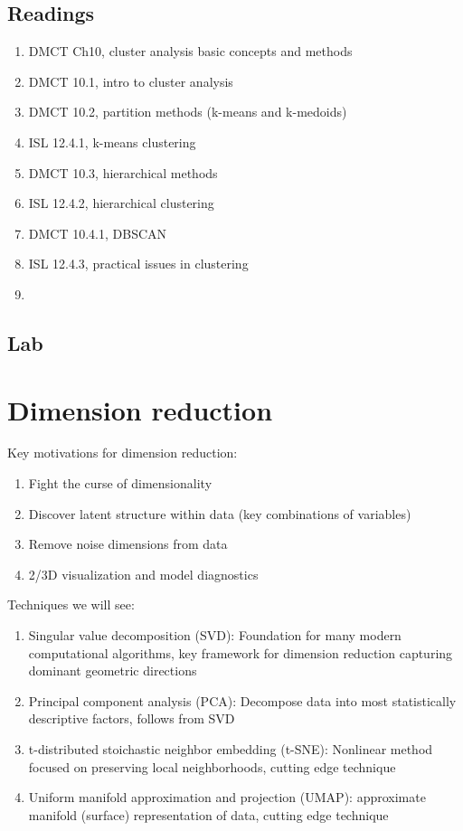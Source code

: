 \documentclass{article}
\begin{document}
\subsection*{Readings}

\begin{enumerate}
\item DMCT Ch10, cluster analysis basic concepts and methods
\item DMCT 10.1, intro to cluster analysis
\item DMCT 10.2, partition methods (k-means and k-medoids)
\item ISL 12.4.1, k-means clustering
\item DMCT 10.3, hierarchical methods
\item ISL 12.4.2, hierarchical clustering 
\item DMCT 10.4.1, DBSCAN
\item ISL 12.4.3, practical issues in clustering
\item 
\end{enumerate}

\subsection*{Lab}


\section*{Dimension reduction} 

Key motivations for dimension reduction: 
\begin{enumerate}
\item Fight the curse of dimensionality
\item Discover latent structure within data (key combinations of variables)
\item Remove noise dimensions from data
\item 2/3D visualization and model diagnostics
\end{enumerate}

Techniques we will see:
\begin{enumerate}
\item Singular value decomposition (SVD): Foundation for many modern computational algorithms, key framework for dimension reduction capturing dominant geometric directions
\item Principal component analysis (PCA): Decompose data into most statistically descriptive factors, follows from SVD
\item t-distributed stoichastic neighbor embedding (t-SNE): Nonlinear method focused on preserving local neighborhoods, cutting edge technique
\item Uniform manifold approximation and projection (UMAP): approximate manifold (surface) representation of data, cutting edge technique
\end{enumerate}
\end{document}
